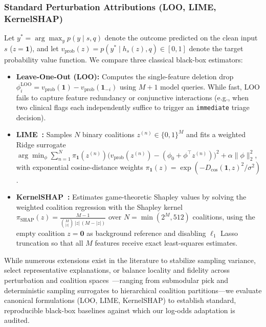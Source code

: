 \documentclass[10pt]{article}
\begin{document}
\subsubsection{Standard Perturbation Attributions (LOO, LIME, KernelSHAP)}
Let $y^* = \arg\max_y p(y \mid s, q)$ denote the outcome predicted on the clean input $s$ ($z = \mathbf{1}$), and let $v_{\text{prob}}(z) = p(y^* \mid h_s(z), q) \in [0, 1]$ denote the target probability value function. We compare three classical black-box estimators:
\begin{itemize}
\item \textbf{Leave-One-Out (LOO):} Computes the single-feature deletion drop $\phi_i^{\text{LOO}} = v_{\text{prob}}(\mathbf{1}) - v_{\text{prob}}(\mathbf{1}_{-i})$ using $M+1$ model queries. While fast, LOO fails to capture feature redundancy or conjunctive interactions (e.g., when two clinical flags each independently suffice to trigger an \texttt{immediate} triage decision).
\item \textbf{LIME~\cite{ribeiro2016}:} Samples $N$ binary coalitions $z^{(n)} \in \{0,1\}^M$ and fits a weighted Ridge surrogate $\arg\min_{\phi} \sum_{n=1}^N \pi_{\mathbf{1}}(z^{(n)}) \big(v_{\text{prob}}(z^{(n)}) - (\phi_0 + \phi^\top z^{(n)})\big)^2 + \alpha \|\phi\|_2^2$, with exponential cosine-distance weights $\pi_{\mathbf{1}}(z) = \exp(-D_{\cos}(\mathbf{1}, z)^2 / \sigma^2)$.
\item \textbf{KernelSHAP~\cite{lundberg2017}:} Estimates game-theoretic Shapley values by solving the weighted coalition regression with the Shapley kernel $\pi_{\text{SHAP}}(z) = \frac{M-1}{\binom{M}{|z|}\, |z|\, (M - |z|)}$ over $N = \min(2^M, 512)$ coalitions, using the empty coalition $z = \mathbf{0}$ as background reference and disabling $\ell_1$ Lasso truncation so that all $M$ features receive exact least-squares estimates.
\end{itemize}
While numerous extensions exist in the literature to stabilize sampling variance, select representative explanations, or balance locality and fidelity across perturbation and coalition spaces~\cite{ribeiro2016,visani2022statistical,jethani2021fastshap,covert2021explaining,gaudel2022slime}---ranging from submodular pick and deterministic sampling surrogates to hierarchical coalition partitions---we evaluate canonical formulations (LOO, LIME, KernelSHAP) to establish standard, reproducible black-box baselines against which our log-odds adaptation is audited.
\end{document}
